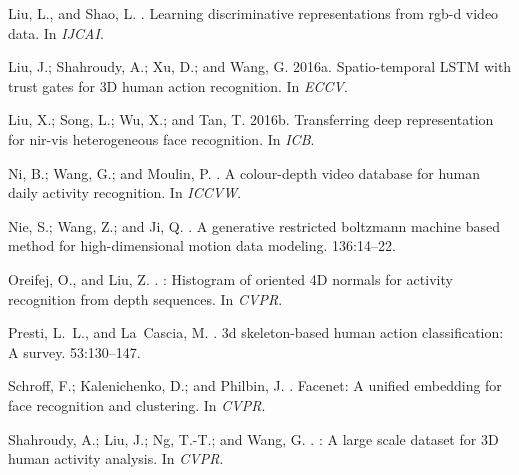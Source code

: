 \documentclass[letterpaper]{article} %
\begin{document}
\begin{thebibliography}{}
Liu, L., and Shao, L.
.
\newblock Learning discriminative representations from rgb-d video data.
\newblock In {\em IJCAI}.

Liu, J.; Shahroudy, A.; Xu, D.; and Wang, G.
\newblock 2016a.
\newblock Spatio-temporal {LSTM} with trust gates for {3D} human action
  recognition.
\newblock In {\em ECCV}.

Liu, X.; Song, L.; Wu, X.; and Tan, T.
\newblock 2016b.
\newblock Transferring deep representation for nir-vis heterogeneous face
  recognition.
\newblock In {\em ICB}.

Ni, B.; Wang, G.; and Moulin, P.
.
\newblock A colour-depth video database for human daily activity recognition.
\newblock In {\em ICCVW}.

Nie, S.; Wang, Z.; and Ji, Q.
.
\newblock A generative restricted boltzmann machine based method for
  high-dimensional motion data modeling.
 136:14--22.

Oreifej, O., and Liu, Z.
.
: Histogram of oriented {4D} normals for activity recognition
  from depth sequences.
\newblock In {\em CVPR}.

Presti, L.~L., and La~Cascia, M.
.
\newblock 3d skeleton-based human action classification: A survey.
 53:130--147.

Schroff, F.; Kalenichenko, D.; and Philbin, J.
.
\newblock Facenet: A unified embedding for face recognition and clustering.
\newblock In {\em CVPR}.

Shahroudy, A.; Liu, J.; Ng, T.-T.; and Wang, G.
.
: A large scale dataset for {3D} human activity analysis.
\newblock In {\em CVPR}.


\end{thebibliography}
\end{document}
